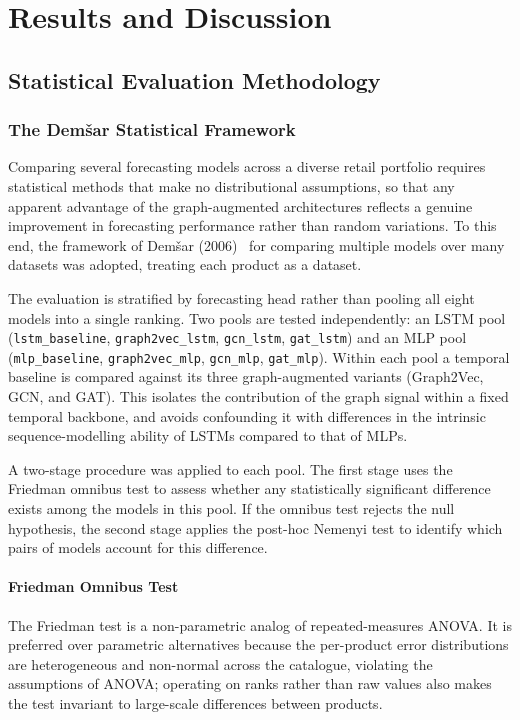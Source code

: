 \chapter{Results and Discussion}
\label{ch:results_and_discussion}



\section{Statistical Evaluation Methodology}
\label{sec:statistical_evaluation_methodology}

\subsection{The Dem\v{s}ar Statistical Framework}
\label{subsec:demsar_framework}

Comparing several forecasting models across a diverse retail portfolio requires
statistical methods that make no distributional assumptions, so that any apparent
advantage of the graph-augmented architectures reflects a genuine improvement in
forecasting performance rather than random variations. To this end, the framework
of Dem\v{s}ar (2006)~\cite{1248547.1248548} for comparing multiple models over
many datasets was adopted, treating each product as a dataset.

The evaluation is stratified by forecasting head rather than pooling all eight
models into a single ranking. Two pools are tested independently: an LSTM pool
(\texttt{lstm\_baseline}, \texttt{graph2vec\_lstm}, \texttt{gcn\_lstm},
\texttt{gat\_lstm}) and an MLP pool (\texttt{mlp\_baseline},
\texttt{graph2vec\_mlp}, \texttt{gcn\_mlp}, \texttt{gat\_mlp}). Within each pool a temporal baseline is compared against its three graph-augmented variants
(Graph2Vec, GCN, and GAT). This isolates the contribution of the graph signal within
a fixed temporal backbone, and avoids confounding it with differences in the
intrinsic sequence-modelling ability of LSTMs compared to that of MLPs.

A two-stage procedure was applied to each pool. The first stage uses the Friedman
omnibus test to assess whether any statistically significant difference exists
among the models in this pool. If the omnibus test rejects the null hypothesis,
the second stage applies the post-hoc Nemenyi test to identify which pairs of
models account for this difference.

\subsubsection{Friedman Omnibus Test}\label{subsubsec:friedman_test}
The Friedman test is a non-parametric analog of repeated-measures ANOVA. It
is preferred over parametric alternatives because the per-product error
distributions are heterogeneous and non-normal across the catalogue, violating
the assumptions of ANOVA; operating on ranks rather than raw values also makes
the test invariant to large-scale differences between products.

